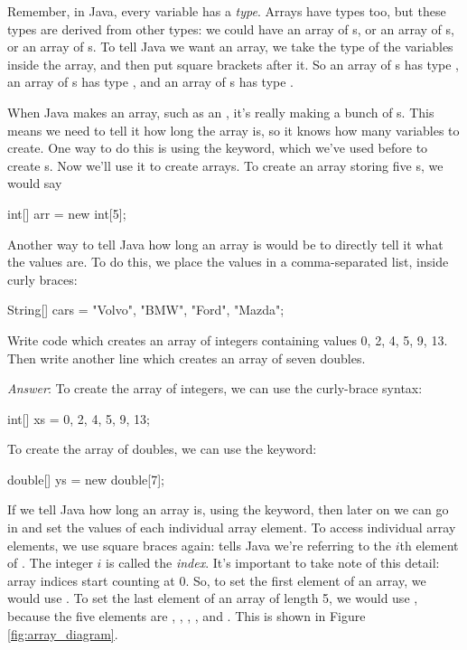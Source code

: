 Remember, in Java, every variable has a \emph{type}. Arrays have types too, but these types are derived from other types: we could have an array of s, or an array of s, or an array of s. To tell Java we want an array, we take the type of the variables inside the array, and then put square brackets after it. So an array of s has type , an array of s has type , and an array of s has type .

When Java makes an array, such as an , it's really making a bunch of s. This means we need to tell it how long the array is, so it knows how many variables to create. One way to do this is using the  keyword, which we've used before to create s. Now we'll use it to create arrays. To create an array storing five s, we would say
\begin{code}
int[] arr = new int[5];
\end{code}
Another way to tell Java how long an array is would be to directly tell it what the values are. To do this, we place the values in a comma-separated list, inside curly braces:
\begin{code}
String[] cars = {"Volvo", "BMW", "Ford", "Mazda"};
\end{code}

\begin{example}
Write code which creates an array  of integers containing values 0, 2, 4, 5, 9, 13. Then write another line which creates an array  of seven doubles.

\noindent\emph{Answer}: To create the array of integers, we can use the curly-brace syntax:
\begin{code}
int[] xs = {0, 2, 4, 5, 9, 13};
\end{code}
To create the array of doubles, we can use the  keyword:
\begin{code}
double[] ys = new double[7];
\end{code}
\end{example}

If we tell Java how long an array is, using the  keyword, then later on we can go in and set the values of each individual array element. To access individual array elements, we use square braces again:  tells Java we're referring to the $i$th element of . The integer $i$ is called the \emph{index}. It's important to take note of this detail: array indices start counting at 0. So, to set the first element of an array, we would use . To set the last element of an array of length 5, we would use , because the five elements are , , , , and . This is shown in Figure \ref{fig:array_diagram}.

